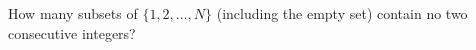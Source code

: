 How many subsets of $\{1,2,\dots,N\}$ (including the empty set) contain no two consecutive integers?
